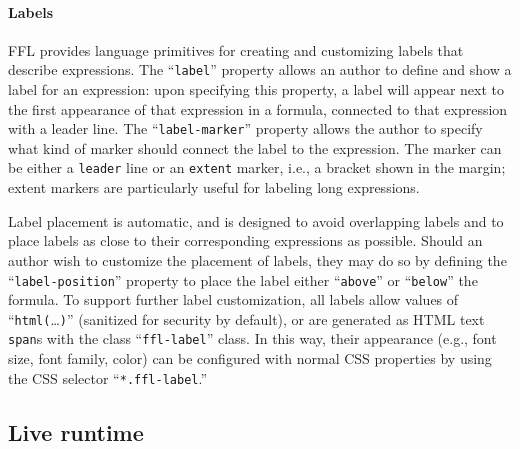 \paragraph{Labels}
FFL provides language primitives for creating and customizing labels that describe expressions. The ``\texttt{label}'' property allows an author to define and show a label for an expression: upon specifying this property, a label will appear next to the first appearance of that expression in a formula, connected to that expression with a leader line. The ``\texttt{label-marker}'' property allows the author to specify what kind of marker should connect the label to the expression. The marker can be either a \texttt{leader} line or an \texttt{extent} marker, i.e., a bracket shown in the margin; extent markers are particularly useful for labeling long expressions.

Label placement is automatic, and is designed to avoid overlapping labels and to place labels as close to their corresponding expressions as possible.  Should an author wish to customize the placement of labels, they may do so by defining the ``\texttt{label-position}'' property to place the label either ``\texttt{above}'' or ``\texttt{below}'' the formula.  To support further label customization, all labels allow values of ``\texttt{html(}\dots\texttt{)}'' (sanitized for security by default), or are generated as HTML text \texttt{span}s with the class ``\texttt{ffl-label}'' class. In this way, their appearance (e.g., font size, font family, color) can be configured with normal CSS properties by using the CSS selector ``\texttt{*.ffl-label}.''


\subsection{Live runtime}

